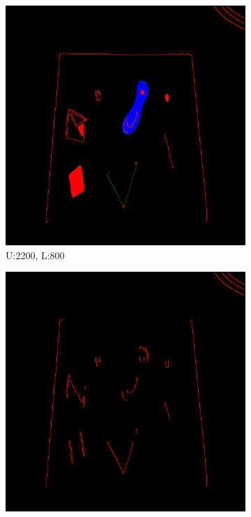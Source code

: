 \documentclass[11pt]{article}
\begin{document}
\begin{figure}[!h]
	\begin{subfigure}[t]{.25\textwidth}
		\centering
		\includegraphics[scale=0.3]{pics/normalThreshTest/Upper2200lower800kernel5.png}
		\caption{U:2200, L:800}
	\end{subfigure}
\hfill
	\begin{subfigure}[t]{.25\textwidth}
		\centering
		\includegraphics[scale=0.3]{pics/normalThreshTest/Upper2200lower1400kernel5.png}

\end{subfigure}
\end{figure}
\end{document}
